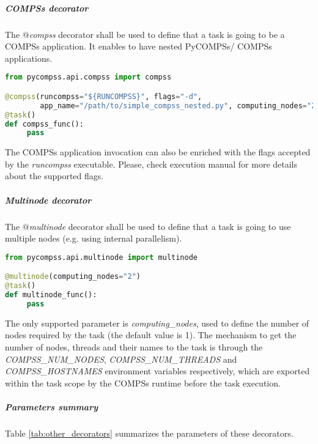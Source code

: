 \vspace{-0.2cm}

\subparagraph{COMPSs decorator}
\label{subpar:compss_decorator}

The {\it $@$compss} decorator shall be used to define that a task is going to be a COMPSs application.
It enables to have nested PyCOMPSs/ COMPSs applications.

\begin{lstlisting}[language=python]
from pycompss.api.compss import compss

@compss(runcompss="${RUNCOMPSS}", flags="-d",
        app_name="/path/to/simple_compss_nested.py", computing_nodes="2")
@task()
def compss_func():
     pass
\end{lstlisting}

The COMPSs application invocation can also be enriched with the flags accepted by the {\it runcompss} executable.
Please, check execution manual for more details about the supported flags.

\vspace{-0.2cm}

\subparagraph{Multinode decorator}
\label{subpar:multinode_decorator}

The {\it $@$multinode} decorator shall be used to define that a task is going to use multiple nodes
(e.g. using internal parallelism).

\begin{lstlisting}[language=python]
from pycompss.api.multinode import multinode

@multinode(computing_nodes="2")
@task()
def multinode_func():
     pass
\end{lstlisting}

The only supported parameter is {\it computing\_nodes}, used to define the number of nodes required by the task (the default value is 1).
The mechanism to get the number of nodes, threads and their names to the task is through the {\it COMPSS\_NUM\_NODES}, {\it COMPSS\_NUM\_THREADS} and
{\it COMPSS\_HOSTNAMES} environment variables respectively, which are exported within the task scope by the COMPSs runtime before the task execution.

\subparagraph{Parameters summary}

Table \ref{tab:other_decorators} summarizes the parameters of these decorators.

